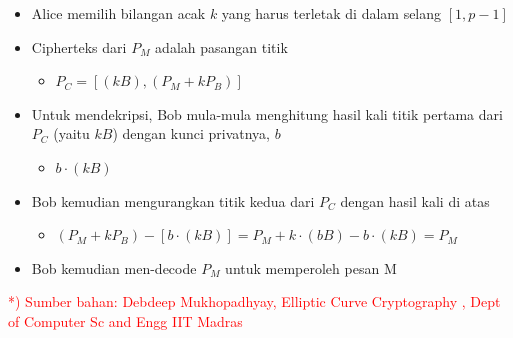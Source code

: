 \documentclass{article}
\begin{document}

\begin{itemize}
    \item Alice memilih bilangan acak $k$ yang harus terletak di dalam selang $[1, p-1]$
    \item Cipherteks dari $P_M$ adalah pasangan titik
    \begin{itemize}
        \item $P_C = [ ( kB), (P_M + kP_B) ]$
    \end{itemize}
    \item Untuk mendekripsi, Bob mula-mula menghitung hasil kali titik pertama dari $P_C$ (yaitu $kB$) dengan kunci privatnya, $b$
    \begin{itemize}
        \item $b \cdot (kB)$
    \end{itemize}
    \item Bob kemudian mengurangkan titik kedua dari $P_C$ dengan hasil kali di atas
    \begin{itemize}
        \item $(P_M + kP_B) - [b \cdot (kB)] = P_M + k \cdot (bB) - b \cdot (kB) = P_M$
    \end{itemize}
    \item Bob kemudian men-decode $P_M$ untuk memperoleh pesan M
\end{itemize}

\vspace{10mm}

\textcolor{red}{*) Sumber bahan: Debdeep Mukhopadhyay, Elliptic Curve Cryptography , Dept of Computer Sc and Engg IIT Madras}
\end{document}
